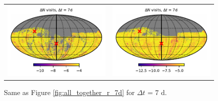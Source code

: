 \documentclass[preprintm,linenumbers]{aastex631}
\begin{document}
\begin{figure}
\begin{tabular}{@{}c@{}c@{}}
         \includegraphics{results/skymaps_cutout/skymaps_cutout_delta_first_year_one_snap_v4_0_10yrs_db_noDD_noTwi_tscale-7_nside-256_doAllTemplateMetrics_reduceCount_g_noDD_noTwi.pdf} &
         \includegraphics{results/skymaps_cutout/skymaps_cutout_delta_first_year_one_snap_v4_0_10yrs_db_noDD_noTwi_tscale-7_nside-256_doAllTemplateMetrics_reduceCount_r_noDD_noTwi.pdf} \\

   \end{tabular}

        \caption{
        Same as Figure \ref{fig:all_together_r_7d} for $\Delta t$ = 7 d. 
        }
        \label{fig:_all_together_r_7d}
	\end{figure}

  
\end{document}
